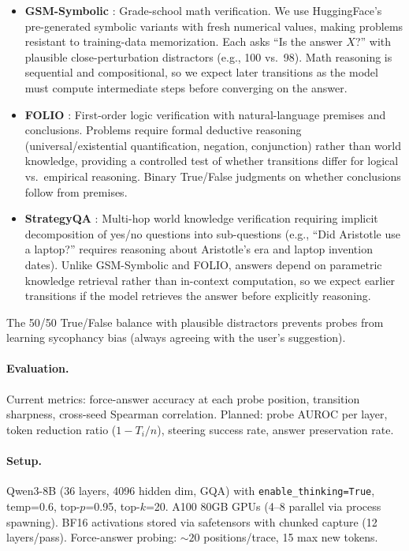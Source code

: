 \documentclass[11pt]{article}
\begin{document}
\begin{itemize}
  \item \textbf{GSM-Symbolic} \citep{gsmsymbolic}: Grade-school math verification. We use HuggingFace's pre-generated symbolic variants with fresh numerical values, making problems resistant to training-data memorization. Each asks ``Is the answer $X$?'' with plausible close-perturbation distractors (e.g., 100 vs.\ 98). Math reasoning is sequential and compositional, so we expect later transitions as the model must compute intermediate steps before converging on the answer.

  \item \textbf{FOLIO} \citep{folio}: First-order logic verification with natural-language premises and conclusions. Problems require formal deductive reasoning (universal/existential quantification, negation, conjunction) rather than world knowledge, providing a controlled test of whether transitions differ for logical vs.\ empirical reasoning. Binary True/False judgments on whether conclusions follow from premises.

  \item \textbf{StrategyQA} \citep{strategyqa}: Multi-hop world knowledge verification requiring implicit decomposition of yes/no questions into sub-questions (e.g., ``Did Aristotle use a laptop?'' requires reasoning about Aristotle's era and laptop invention dates). Unlike GSM-Symbolic and FOLIO, answers depend on parametric knowledge retrieval rather than in-context computation, so we expect earlier transitions if the model retrieves the answer before explicitly reasoning.
\end{itemize}

The 50/50 True/False balance with plausible distractors prevents probes from learning sycophancy bias (always agreeing with the user's suggestion).

\paragraph{Evaluation.}
Current metrics: force-answer accuracy at each probe position, transition sharpness, cross-seed Spearman correlation. Planned: probe AUROC per layer, token reduction ratio ($1 - T_i/n$), steering success rate, answer preservation rate.

\paragraph{Setup.}
Qwen3-8B (36 layers, 4096 hidden dim, GQA) with \texttt{enable\_thinking=True}, temp=0.6, top-$p$=0.95, top-$k$=20. A100 80GB GPUs (4--8 parallel via process spawning). BF16 activations stored via safetensors with chunked capture (12 layers/pass). Force-answer probing: ${\sim}20$ positions/trace, 15 max new tokens.
\end{document}
